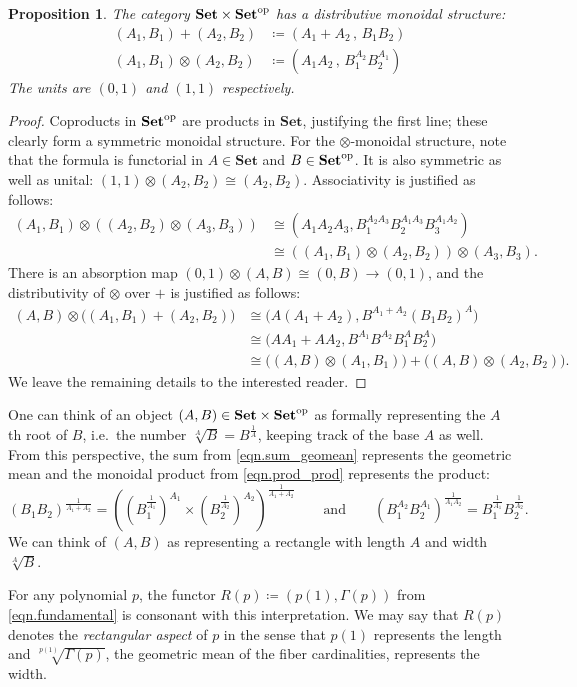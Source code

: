 \documentclass[11pt, one side, article]{memoir}
\theoremstyle{definition}
\theoremstyle{plain}
\newtheorem{proposition}[definitionx]{Proposition}
\newenvironment{remark}
  {\pushQED{\qed}\renewcommand{\qedsymbol}{$\lozenge$}\remarkx}
  {\popQED\endremarkx}
\newcommand{\Cat}[1]{\mathbf{#1}}%
\newcommand{\op}{^\tn{op}}
\newcommand{\tn}[1]{\textnormal{#1}}
\newcommand{\smset}{\Cat{Set}}
\newcommand{\0}{\textsf{0}}
\newcommand{\1}{\tn{\textsf{1}}}
\newcommand{\R}{R}
\newcommand{\qqand}{\qquad\text{and}\qquad}
\begin{document}
\begin{proposition}
The category $\smset\times\smset\op$ has a distributive monoidal structure:
\begin{align}
  (A_1,B_1)+(A_2,B_2)&\coloneqq(A_1+A_2\,,\,B_1B_2)
  \label{eqn.sum_geomean}\\\label{eqn.prod_prod}
  (A_1,B_1)\otimes(A_2,B_2)&\coloneqq(A_1A_2\,,\,B_1^{A_2}B_2^{A_1})
\end{align}
The units are $(0,1)$ and $(1,1)$ respectively.
\end{proposition}
\begin{proof}
Coproducts in $\smset\op$ are products in $\smset$, justifying the first line; these clearly form a symmetric monoidal structure. For the $\otimes$-monoidal structure, note that the formula is functorial in $A\in\smset$ and $B\in\smset\op$. It is also symmetric as well as unital: $(1,1)\otimes(A_2,B_2)\cong(A_2,B_2)$. Associativity is justified as follows:
\begin{align*}
  (A_1,B_1)\otimes((A_2,B_2)\otimes(A_3,B_3))&\cong
	(A_1A_2A_3,B_1^{A_2A_3}B_2^{A_1A_3}B_3^{A_1A_2})\\&\cong
	((A_1,B_1)\otimes(A_2,B_2))\otimes(A_3,B_3).
\end{align*}
There is an absorption map $(0,1)\otimes (A,B)\cong(0,B)\to(0,1)$, and the distributivity of $\otimes$ over $+$ is justified as follows:
\begin{align*}
  (A,B)\otimes\big((A_1,B_1)+(A_2,B_2)\big)&\cong 
  \big(A(A_1+A_2),B^{A_1+A_2}(B_1B_2)^A\big)\\&\cong
  \big(AA_1+AA_2,B^{A_1}B^{A_2}B_1^AB_2^A\big)\\&\cong
  \big((A,B)\otimes(A_1,B_1))+((A,B)\otimes(A_2,B_2)\big).
\end{align*}
We leave the remaining details to the interested reader.
\end{proof}

\begin{remark}[Formal roots and rectangular aspect]\label{rem.geomean}
One can think of an object $(A,B)\in\smset\times\smset\op$ as formally representing the $A$th root of $B$, i.e.\ the number $\sqrt[A]{B}=B^{\frac{1}{A}}$, keeping track of the base $A$ as well. From this perspective, the sum from \eqref{eqn.sum_geomean} represents the geometric mean and the monoidal product from \eqref{eqn.prod_prod} represents the product:
\[
(B_1B_2)^\frac{1}{A_1+A_2}=\left(\left(B_1^\frac{1}{A_1}\right)^{A_1}\times \left(B_2^\frac{1}{A_2}\right)^{A_2}\right)^{\frac{1}{A_1+A_2}}
\qqand
(B_1^{A_2}B_2^{A_1})^\frac{1}{A_1A_2}=B_1^\frac{1}{A_1}B_2^\frac{1}{A_2}.
\]
We can think of $(A,B)$ as representing a rectangle with length $A$ and width $\sqrt[A]{B}$.

For any polynomial $p$, the functor $\R(p)\coloneqq(p(1),\Gamma(p))$ from \eqref{eqn.fundamental} is consonant with this interpretation. We may say that $\R(p)$ denotes the \emph{rectangular aspect} of $p$ in the sense that $p(1)$ represents the length and $\sqrt[p(1)]{\Gamma(p)}$, the geometric mean of the fiber cardinalities, represents the width.
\end{remark}
\end{document}

